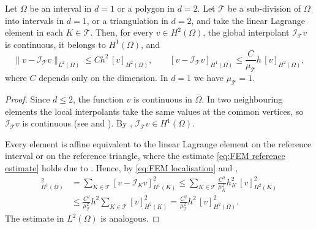 \begin{strongtheorem}
    \label{thm:FEM interpolation error linear elements}
    Let $\Omega$ be an interval in $d = 1$ or a polygon in $d = 2$. Let $\mathcal T$ be a sub-division of $\Omega$ into intervals in $d = 1$, or a triangulation in $d = 2$, and take the linear Lagrange element in each $K \in \mathcal T$.
    Then, for every $v \in H^2(\Omega)$, the global interpolant $\mathcal I_{\mathcal T} v$ is continuous, it belongs to $H^1(\Omega)$, and
    \begin{equation*}
        \| v - \mathcal I_{\mathcal T} v \|_{L^2(\Omega)} \le C h^2\, [ v ]_{H^2(\Omega)},
        \qquad
        [ v - \mathcal I_{\mathcal T} v ]_{H^1(\Omega)} \le \frac{C}{\mu_{\mathcal T}} h\, [ v ]_{H^2(\Omega)},
    \end{equation*}
    where $C$ depends only on the dimension. In $d = 1$ we have $\mu_{\mathcal T} = 1$.
\end{strongtheorem}
\begin{proof}
    Since $d \le 2$, the function $v$ is continuous in $\overline \Omega$.
    In two neighbouring elements the local interpolants take the same values at the common vertices, so $\mathcal I_{\mathcal T} v$ is continuous (see  and ). By , $\mathcal I_{\mathcal T} v \in H^1(\Omega)$.

    Every element is affine equivalent to the linear Lagrange element on the reference interval or on the reference triangle, where the estimate \eqref{eq:FEM reference estimate} holds due to .
    Hence, by \eqref{eq:FEM localisation} and ,
    \begin{align*}
        [ v - \mathcal I_{\mathcal T} v ]_{H^1(\Omega)}^2
         & = \sum_{K \in \mathcal T} [ v - \mathcal I_K v ]_{H^1(K)}^2
        \le \sum_{K \in \mathcal T} \frac{C^2}{\mu_K^2} h_K^2\, [ v ]_{H^2(K)}^2
        \\
         & \le \frac{C^2}{\mu_{\mathcal T}^2} h^2 \sum_{K \in \mathcal T} [ v ]_{H^2(K)}^2
        = \frac{C^2}{\mu_{\mathcal T}^2} h^2\, [ v ]_{H^2(\Omega)}^2 .
    \end{align*}
    The estimate in $L^2(\Omega)$ is analogous.
\end{proof}

